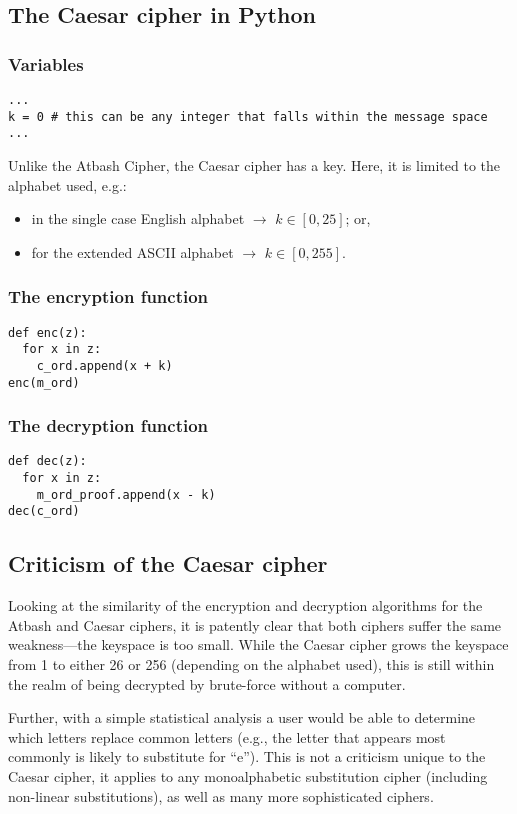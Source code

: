 \documentclass{AIAA}
\begin{document}
\subsection{The Caesar cipher in Python}

\subsubsection{Variables}
\begin{verbatim}
...
k = 0 # this can be any integer that falls within the message space
...
\end{verbatim}
Unlike the Atbash Cipher, the Caesar cipher has a key. Here, it is limited to the alphabet used, e.g.:
\begin{itemize}
	\item in the single case English alphabet $\longrightarrow$ $k \in [0,25]$; or,
	\item for the extended ASCII alphabet $\longrightarrow$ $k \in [0,255]$.
\end{itemize}

\subsubsection{The encryption function}
\begin{verbatim}
def enc(z):
  for x in z:
    c_ord.append(x + k)
enc(m_ord)
\end{verbatim}

\subsubsection{The decryption function}
\begin{verbatim}
def dec(z):
  for x in z:
    m_ord_proof.append(x - k)
dec(c_ord)
\end{verbatim}

\subsection{Criticism of the Caesar cipher}
Looking at the similarity of the encryption and decryption algorithms for the Atbash and Caesar ciphers, it is patently clear that both ciphers suffer the same weakness---the keyspace is too small. While the Caesar cipher grows the keyspace from 1 to either 26 or 256 (depending on the alphabet used), this is still within the realm of being decrypted by brute-force without a computer.

Further, with a simple statistical analysis a user would be able to determine which letters replace common letters (e.g., the letter that appears most commonly is likely to substitute for ``e''). This is not a criticism unique to the Caesar cipher, it applies to any monoalphabetic substitution cipher (including non-linear substitutions), as well as many more sophisticated ciphers.
\end{document}
